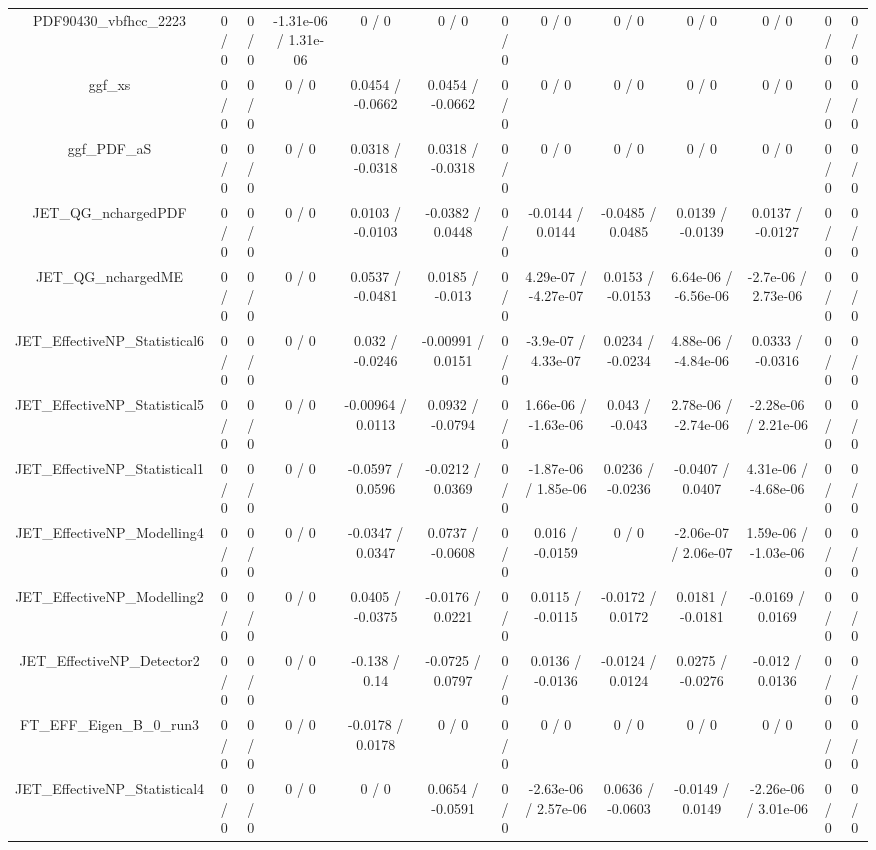 \documentclass[10pt]{article}
\begin{document}
\begin{table}[htbp]
\begin{center}
\begin{tabular}{|c|c|c|c|c|c|c|c|c|c|c|c|c|}
  PDF90430_vbfhcc_2223 & 0 / 0 & 0 / 0 & -1.31e-06 / 1.31e-06 & 0 / 0 & 0 / 0 & 0 / 0 & 0 / 0 & 0 / 0 & 0 / 0 & 0 / 0 & 0 / 0 & 0 / 0 \\ 
  ggf_xs & 0 / 0 & 0 / 0 & 0 / 0 & 0.0454 / -0.0662 & 0.0454 / -0.0662 & 0 / 0 & 0 / 0 & 0 / 0 & 0 / 0 & 0 / 0 & 0 / 0 & 0 / 0 \\ 
  ggf_PDF_aS & 0 / 0 & 0 / 0 & 0 / 0 & 0.0318 / -0.0318 & 0.0318 / -0.0318 & 0 / 0 & 0 / 0 & 0 / 0 & 0 / 0 & 0 / 0 & 0 / 0 & 0 / 0 \\ 
  JET_QG_nchargedPDF & 0 / 0 & 0 / 0 & 0 / 0 & 0.0103 / -0.0103 & -0.0382 / 0.0448 & 0 / 0 & -0.0144 / 0.0144 & -0.0485 / 0.0485 & 0.0139 / -0.0139 & 0.0137 / -0.0127 & 0 / 0 & 0 / 0 \\ 
  JET_QG_nchargedME & 0 / 0 & 0 / 0 & 0 / 0 & 0.0537 / -0.0481 & 0.0185 / -0.013 & 0 / 0 & 4.29e-07 / -4.27e-07 & 0.0153 / -0.0153 & 6.64e-06 / -6.56e-06 & -2.7e-06 / 2.73e-06 & 0 / 0 & 0 / 0 \\ 
  JET_EffectiveNP_Statistical6 & 0 / 0 & 0 / 0 & 0 / 0 & 0.032 / -0.0246 & -0.00991 / 0.0151 & 0 / 0 & -3.9e-07 / 4.33e-07 & 0.0234 / -0.0234 & 4.88e-06 / -4.84e-06 & 0.0333 / -0.0316 & 0 / 0 & 0 / 0 \\ 
  JET_EffectiveNP_Statistical5 & 0 / 0 & 0 / 0 & 0 / 0 & -0.00964 / 0.0113 & 0.0932 / -0.0794 & 0 / 0 & 1.66e-06 / -1.63e-06 & 0.043 / -0.043 & 2.78e-06 / -2.74e-06 & -2.28e-06 / 2.21e-06 & 0 / 0 & 0 / 0 \\ 
  JET_EffectiveNP_Statistical1 & 0 / 0 & 0 / 0 & 0 / 0 & -0.0597 / 0.0596 & -0.0212 / 0.0369 & 0 / 0 & -1.87e-06 / 1.85e-06 & 0.0236 / -0.0236 & -0.0407 / 0.0407 & 4.31e-06 / -4.68e-06 & 0 / 0 & 0 / 0 \\ 
  JET_EffectiveNP_Modelling4 & 0 / 0 & 0 / 0 & 0 / 0 & -0.0347 / 0.0347 & 0.0737 / -0.0608 & 0 / 0 & 0.016 / -0.0159 & 0 / 0 & -2.06e-07 / 2.06e-07 & 1.59e-06 / -1.03e-06 & 0 / 0 & 0 / 0 \\ 
  JET_EffectiveNP_Modelling2 & 0 / 0 & 0 / 0 & 0 / 0 & 0.0405 / -0.0375 & -0.0176 / 0.0221 & 0 / 0 & 0.0115 / -0.0115 & -0.0172 / 0.0172 & 0.0181 / -0.0181 & -0.0169 / 0.0169 & 0 / 0 & 0 / 0 \\ 
  JET_EffectiveNP_Detector2 & 0 / 0 & 0 / 0 & 0 / 0 & -0.138 / 0.14 & -0.0725 / 0.0797 & 0 / 0 & 0.0136 / -0.0136 & -0.0124 / 0.0124 & 0.0275 / -0.0276 & -0.012 / 0.0136 & 0 / 0 & 0 / 0 \\ 
  FT_EFF_Eigen_B_0_run3 & 0 / 0 & 0 / 0 & 0 / 0 & -0.0178 / 0.0178 & 0 / 0 & 0 / 0 & 0 / 0 & 0 / 0 & 0 / 0 & 0 / 0 & 0 / 0 & 0 / 0 \\ 
  JET_EffectiveNP_Statistical4 & 0 / 0 & 0 / 0 & 0 / 0 & 0 / 0 & 0.0654 / -0.0591 & 0 / 0 & -2.63e-06 / 2.57e-06 & 0.0636 / -0.0603 & -0.0149 / 0.0149 & -2.26e-06 / 3.01e-06 & 0 / 0 & 0 / 0 \\ 

\end{tabular}
\end{center}
\end{table}
\end{document}
